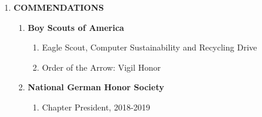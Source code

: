 \documentclass[11pt]{article}
\begin{document}
\begin{center}
\begin{enumerate}[label={}, leftmargin=0pt]
   \item {\Large \textbf{COMMENDATIONS}}
   \begin{enumerate}[label={}]
       \item \textbf{Boy Scouts of America}
       \begin{enumerate}[label={--}]
           \item Eagle Scout, Computer Sustainability and Recycling Drive
           \item Order of the Arrow: Vigil Honor
       \end{enumerate}
       \item \textbf{National German Honor Society}
       \begin{enumerate}[label={--}]
           \item Chapter President, 2018-2019
       \end{enumerate}
   \end{enumerate}
\end{enumerate}
\end{center}
\end{document}
